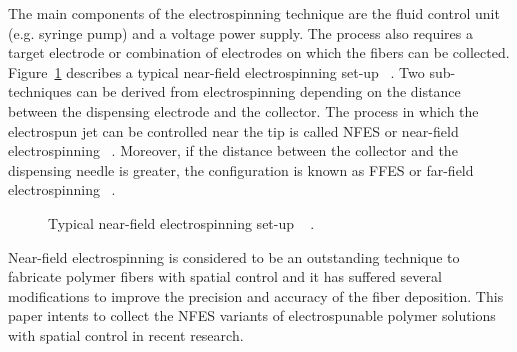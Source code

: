 \documentclass[5p,,preprint,12pt,twocolumn]{elsarticle}
\makeatletter
\def\fixFloatSize#1{}%
\makeatother
\begin{document}
The main components of the electrospinning technique are the fluid control unit (e.g. syringe pump) and a voltage power supply. The process also requires a target electrode or combination of electrodes on which the fibers can be collected.  Figure~\ref{f-fe28447572e9} describes a typical near-field electrospinning set-up \unskip~\cite{527120:12073538}. Two sub-techniques can be derived from electrospinning depending on the distance between the dispensing electrode and the collector. The process in which the electrospun jet can be controlled near the tip is called NFES or near-field electrospinning \unskip~\cite{527120:12033655}. Moreover, if the distance between the collector and the dispensing needle is greater, the configuration is known as FFES or far-field electrospinning \unskip~\cite{527120:12073581}.


\bgroup
\fixFloatSize{images/596d6818-a246-493e-bea0-03f815ab8ff8-unfes.jpg}
\begin{figure}[!htbp]
\centering \makeatletter{}
\makeatother 
\caption{{Typical near-field electrospinning set-up \unskip~\protect\cite{527120:11973130} .}}
\label{f-fe28447572e9}
\end{figure}
\egroup
Near-field electrospinning is considered to be an outstanding technique to fabricate polymer fibers with spatial control and it has suffered several modifications to improve the precision and accuracy of the fiber deposition. This paper intents to collect the NFES variants of electrospunable polymer solutions with spatial control in recent research.
    
\end{document}
